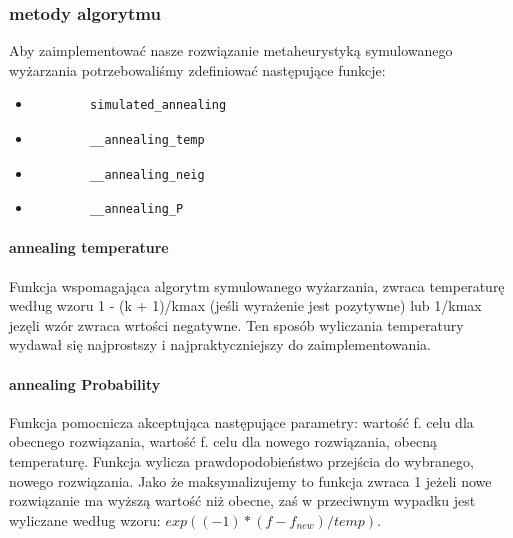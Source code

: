 \documentclass[12pt,a4paper]{article}
\begin{document}
\subsubsection{metody algorytmu}
Aby zaimplementować nasze rozwiązanie metaheurystyką symulowanego wyżarzania potrzebowaliśmy zdefiniować następujące funkcje: 

\begin{itemize}
	\item \begin{verbatim}
		simulated_annealing	
	\end{verbatim}
	
	\item \begin{verbatim}
		__annealing_temp
	\end{verbatim}

	\item \begin{verbatim}
		__annealing_neig
	\end{verbatim}

	\item \begin{verbatim}
		__annealing_P
	\end{verbatim}

\end{itemize}

\paragraph{annealing temperature}
Funkcja wspomagająca algorytm symulowanego wyżarzania, zwraca temperaturę według wzoru 1 - (k + 1)/kmax (jeśli wyrażenie jest pozytywne) lub 1/kmax jezęli wzór zwraca wrtości negatywne.
Ten sposób wyliczania temperatury wydawał się najprostszy i najpraktyczniejszy do zaimplementowania.

\paragraph{annealing Probability}
Funkcja pomocnicza akceptująca następujące parametry: wartość f. celu dla obecnego rozwiązania, wartość f. celu dla nowego rozwiązania, obecną temperaturę. Funkcja wylicza prawdopodobieństwo przejścia do wybranego, nowego rozwiązania.
Jako że maksymalizujemy to funkcja zwraca 1 jeżeli nowe rozwiązanie ma wyższą wartość niż obecne, zaś w przeciwnym wypadku jest wyliczane według wzoru: $ exp( (-1)* (f - f_{new}) / temp ) $. 
\end{document}
